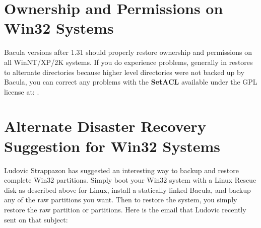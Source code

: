 \section{Ownership and Permissions on Win32 Systems}

Bacula versions after 1.31 should properly restore ownership and permissions
on all WinNT/XP/2K systems. If you do experience problems, generally in
restores to alternate directories because higher level directories were not
backed up by Bacula, you can correct any problems with the {\bf SetACL}
available under the GPL license at: 
. 

\section{Alternate Disaster Recovery Suggestion for Win32 Systems}

Ludovic Strappazon has suggested an interesting way to backup and restore
complete Win32 partitions. Simply boot your Win32 system with a Linux Rescue
disk as described above for Linux, install a statically linked Bacula, and
backup any of the raw partitions you want. Then to restore the system, you
simply restore the raw partition or partitions. Here is the email that Ludovic
recently sent on that subject: 

